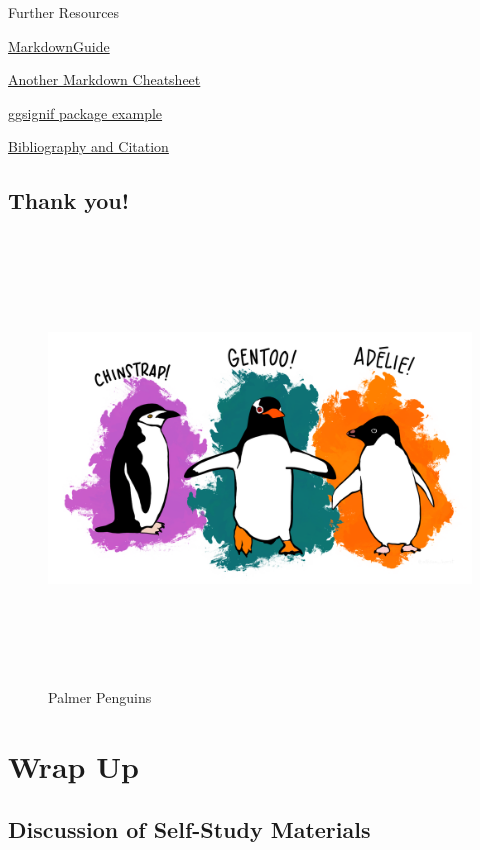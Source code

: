 \documentclass[
]{book}
\begin{document}
Further Resources

\href{https://www.markdownguide.org/basic-syntax/}{MarkdownGuide}

\href{https://www.markdownguide.org/cheat-sheet/}{Another Markdown Cheatsheet}

\href{https://statisticsglobe.com/ggsignif-package-r}{ggsignif package example}

\href{https://bookdown.org/yihui/rmarkdown-cookbook/bibliography.html}{Bibliography and Citation}

\section{Thank you!}\label{thank-you-4}

\begin{figure}
\centering
\includegraphics[width=\textwidth,height=4.6875in]{./img/palmer_penguins.png}
\caption{Palmer Penguins}\label{id}
\end{figure}

\chapter{Wrap Up}\label{wrap-up}

\section{Discussion of Self-Study Materials}\label{discussion-of-self-study-materials}
\end{document}
